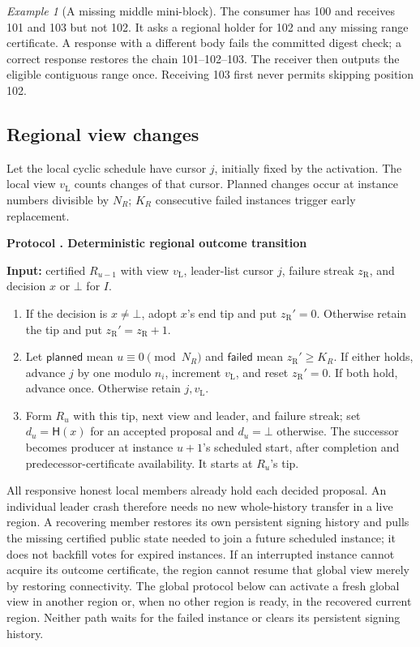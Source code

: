 \documentclass[11pt,a4paper,onecolumn]{article}
\newcommand{\Hash}{\mathsf H}
\newcommand{\lv}{v_{\mathrm L}}
\newcommand{\botv}{\bot}
\theoremstyle{remark}\newtheorem{example}[definition]{Example}
\newcounter{protocol}
\newenvironment{protocol}[2]{\refstepcounter{protocol}\label{#1}\begin{mdframed}[nobreak=true,linewidth=.6pt,skipabove=10pt,skipbelow=10pt,innertopmargin=8pt,innerbottommargin=8pt]\small\raggedright\noindent\textbf{Protocol \theprotocol. #2}\par\smallskip}{\end{mdframed}}
\begin{document}
\begin{example}[A missing middle mini-block]
The consumer has 100 and receives 101 and 103 but not 102. It asks a regional
holder for 102 and any missing range certificate. A response with a different
body fails the committed digest check; a correct response restores the chain
101--102--103. The receiver then outputs the eligible contiguous range once.
Receiving 103 first never permits skipping position 102.
\end{example}

\subsection{Regional view changes}\label{sec:localchange}
Let the local cyclic schedule have cursor $j$, initially fixed by the activation.
The local view $\lv$ counts changes of that cursor. Planned changes occur at
instance numbers divisible by $N_R$; $K_R$ consecutive failed instances trigger
early replacement.

\begin{protocol}{alg:localchange}{Deterministic regional outcome transition}
\textbf{Input:} certified $R_{u-1}$ with view $\lv$, leader-list cursor $j$,
failure streak $z_{\mathrm R}$, and decision $x$ or $\botv$ for $I$.
\begin{enumerate}[label=\textbf{L\arabic*.}]
\item If the decision is $x\neq\botv$, adopt $x$'s end tip and put
$z_{\mathrm R}'=0$. Otherwise retain the tip and put
$z_{\mathrm R}'=z_{\mathrm R}+1$.
\item Let $\mathsf{planned}$ mean $u\equiv0\pmod{N_R}$ and
$\mathsf{failed}$ mean $z_{\mathrm R}'\geq K_R$.
If either holds, advance $j$ by one modulo $n_i$, increment $\lv$, and reset
$z_{\mathrm R}'=0$. If both hold, advance once. Otherwise retain $j,\lv$.
\item Form $R_u$ with this tip, next view and leader, and failure streak;
set $d_u=\Hash(x)$ for an accepted proposal and $d_u=\botv$ otherwise.
The successor becomes producer at instance $u+1$'s scheduled start, after
completion and predecessor-certificate availability. It starts at $R_u$'s tip.
\end{enumerate}
\end{protocol}

All responsive honest local members already hold each decided proposal. An individual
leader crash therefore needs no new whole-history transfer in a live region.
A recovering member restores its own persistent signing history and pulls the
missing certified public state needed to join a future scheduled instance;
it does not backfill votes for expired
instances. If an interrupted instance cannot acquire its outcome certificate,
the region cannot resume that global view merely by restoring connectivity.
The global protocol below can activate a fresh global view in another region
or, when no other region is ready, in the recovered current region. Neither
path waits for the failed instance or clears its persistent signing history.
\end{document}
